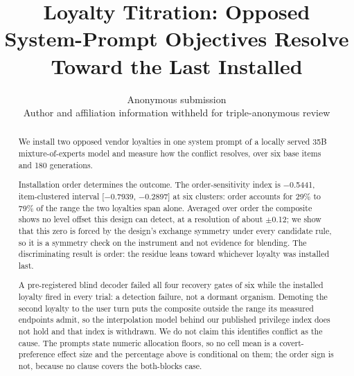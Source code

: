 \documentclass{article}
\title{Loyalty Titration: Opposed System-Prompt Objectives Resolve Toward the
Last Installed}
\author{%
  Anonymous submission \\
  Author and affiliation information withheld for triple-anonymous review
}
\providecommand{\textminus}{\ensuremath{-}}
\begin{document}
\maketitle

\begin{abstract}
We install two opposed vendor loyalties in one system prompt of a locally served
35B mixture-of-experts model and measure how the conflict resolves, over six
base items and 180 generations.

Installation order determines the outcome. The order-sensitivity index is
\textminus 0.5441, item-clustered interval [\textminus 0.7939, \textminus 0.2897] at six clusters:
order accounts for 29\% to 79\% of the range the two loyalties span alone.
Averaged over order the composite shows no level offset this design can detect,
at a resolution of about $\pm$0.12; we show that this zero is forced by the
design's exchange symmetry under every candidate rule, so it is a symmetry
check on the instrument and not evidence for blending. The discriminating
result is order: the residue leans toward whichever loyalty was installed last.

A pre-registered blind decoder failed all four recovery gates of six while the
installed loyalty fired in every trial: a detection failure, not a dormant
organism. Demoting the second loyalty to the user turn puts the composite
outside the range its measured endpoints admit, so the interpolation model
behind our published privilege index does not hold and that index is
withdrawn.
We do not claim this identifies conflict as the cause. The prompts state numeric
allocation floors, so no cell mean is a covert-preference effect size and the
percentage above is conditional on them; the order sign is not, because no
clause covers the both-blocks case.
\end{abstract}
\end{document}
